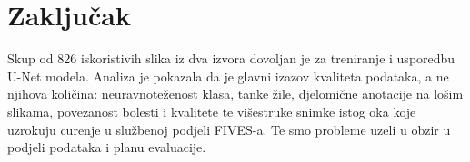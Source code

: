 \documentclass[conference]{IEEEtran}
\begin{document}
\section{Zaključak}
Skup od 826 iskoristivih slika iz dva izvora dovoljan je za treniranje i usporedbu U-Net modela. Analiza je pokazala da je glavni izazov kvaliteta podataka, a ne njihova količina: neuravnoteženost klasa, tanke žile, djelomične anotacije na lošim slikama, povezanost bolesti i kvalitete te višestruke snimke istog oka koje uzrokuju curenje u službenoj podjeli FIVES-a. Te smo probleme uzeli u obzir u podjeli podataka i planu evaluacije.



\end{document}
